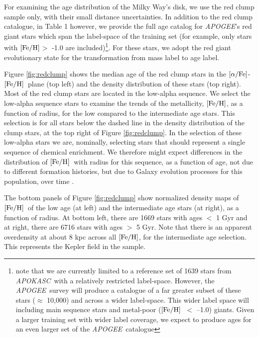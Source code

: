 \documentclass[12pt, preprint]{aastex}
\newcommand{\project}[1]{\textsl{#1}}
\newcommand{\apogee}{\project{APOGEE}}
\newcommand{\apokasc}{\project{APOKASC}}
\newcommand{\feh}{\mbox{$\rm [Fe/H]$}}
\newcommand{\alphafe}{\mbox{$\rm [\alpha/Fe]$}}
\begin{document}
For examining the age distribution of the Milky Way's disk, we use the red clump sample only, with their small distance uncertainties. In addition to the red clump catalogue, in Table 1 however, we provide the full age catalog for \apogee's red giant stars which span the label-space of the training set (for example, only stars with \feh $>$ -1.0 are included)\footnote{note that we are currently limited to a reference set of 1639 stars from \apokasc\ with a relatively restricted label-space. However, the \apogee\ survey will produce a catalogue of a far greater subset of these stars ($\approx$ 10,000) and across a wider label-space. This wider label space will including main sequence stars and metal-poor (\feh\ $<$ --1.0) giants. Given a larger training set with wider label coverage, we expect to produce ages for an even larger set of the \apogee\ catalogue}. For these stars, we adopt the red giant evolutionary state for the transformation from mass label to age label. 


Figure \ref{fig:redclump} shows the median age of the red clump stars in the \alphafe-\feh\ plane (top left) and the density distribution of these stars (top right).  Most of the red clump stars are located in the low-alpha sequence. We select the low-alpha sequence stars to examine the trends of the metallicity, \feh, as a function of radius, for the low compared to the intermediate age stars. This selection is for all stars below the dashed line in the density distribution of the clump stars, at the top right of Figure \ref{fig:redclump}. In the selection of these low-alpha stars we are, nominally, selecting stars that should represent a single sequence of chemical enrichment. We therefore might expect differences in the distribution of \feh\ with radius for this sequence, as a function of age, not due to different formation histories, but due to Galaxy evolution processes for this population, over time \citep[e.g.][]{Roskar2008, Schonrich2009}. 

The bottom panels of Figure \ref{fig:redclump} show normalized density maps of \feh\ of the low age (at left) and the intermediate age stars (at right), as a function of radius. At bottom left, there are 1669 stars with ages $<$ 1 Gyr and at right, there are 6716 stars with ages $>$ 5 Gyr. Note that there is an apparent overdensity at about 8 kpc across all \feh, for the intermediate age selection. This represents the Kepler field in the sample.
\end{document}

